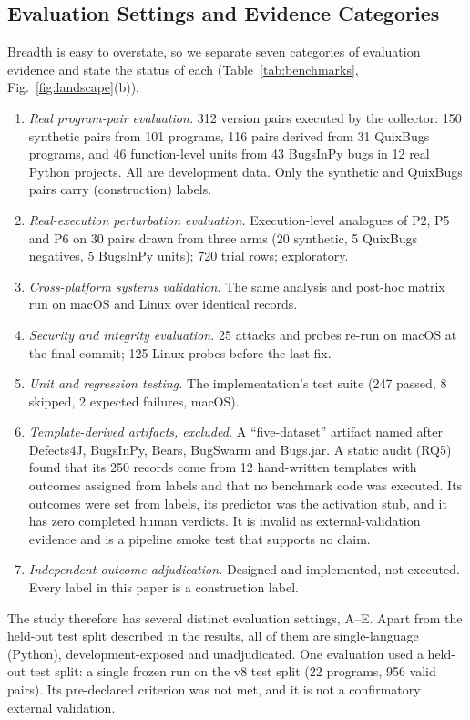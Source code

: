 \subsection{Evaluation Settings and Evidence Categories}
Breadth is easy to overstate, so we separate seven categories of evaluation evidence and state the status of each (Table~\ref{tab:benchmarks}, Fig.~\ref{fig:landscape}(b)).
\begin{enumerate}
\item[A)] \emph{Real program-pair evaluation.} 312 version pairs executed by the collector: 150 synthetic pairs from 101 programs, 116 pairs derived from 31 QuixBugs programs, and 46 function-level units from 43 BugsInPy bugs in 12 real Python projects. All are development data. Only the synthetic and QuixBugs pairs carry (construction) labels.
\item[B)] \emph{Real-execution perturbation evaluation.} Execution-level analogues of P2, P5 and P6 on 30 pairs drawn from three arms (20 synthetic, 5 QuixBugs negatives, 5 BugsInPy units); 720 trial rows; exploratory.
\item[C)] \emph{Cross-platform systems validation.} The same analysis and post-hoc \ers{} matrix run on macOS and Linux over identical records.
\item[D)] \emph{Security and integrity evaluation.} 25 attacks and probes re-run on macOS at the final commit; 125 Linux probes before the last fix.
\item[E)] \emph{Unit and regression testing.} The implementation's test suite (247 passed, 8 skipped, 2 expected failures, macOS).
\item[F)] \emph{Template-derived artifacts, excluded.} A ``five-dataset'' artifact named after Defects4J, BugsInPy, Bears, BugSwarm and Bugs.jar. A static audit (RQ5) found that its 250 records come from 12 hand-written templates with outcomes assigned from labels and that no benchmark code was executed. Its outcomes were set from labels, its predictor was the activation stub, and it has zero completed human verdicts. It is invalid as external-validation evidence and is a pipeline smoke test that supports no claim.
\item[G)] \emph{Independent outcome adjudication.} Designed and implemented, not executed. Every label in this paper is a construction label.
\end{enumerate}
The study therefore has several distinct evaluation settings, A--E. Apart from the held-out test split described in the results, all of them are single-language (Python), development-exposed and unadjudicated. One evaluation used a held-out test split: a single frozen run on the v8 test split (22 programs, 956 valid pairs). Its pre-declared criterion was not met, and it is not a confirmatory external validation.

